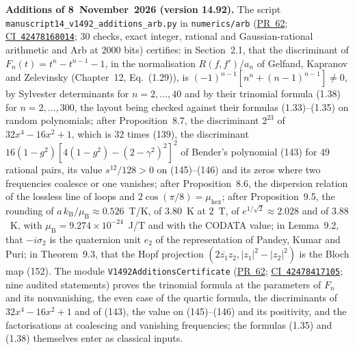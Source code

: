\documentclass[11pt,a4paper]{article}
\newcommand{\R}{https://github.com/ralfanop/Certifications_Eulerian_polar-curve_computations}
\newcommand{\PR}[1]{\href{\R/pull/#1}{PR~#1}}
\newcommand{\CI}[1]{\href{\R/actions/runs/#1}{CI~\texttt{#1}}}
\newcommand{\eq}[1]{(#1)}
\begin{document}
\textbf{Additions of 8~November~2026 (version 14.92).} The script \texttt{manuscript14\_\allowbreak v1492\_\allowbreak additions\_\allowbreak arb.py} in \texttt{numerics/\allowbreak arb} (\PR{62}; \CI{42478168014}; 30 checks, exact integer, rational and Gaussian-rational arithmetic and Arb at 2000 bits) certifies: in Section~2.1, that the discriminant of $F_n(t)=t^n-t^{n-1}-1$, in the normalisation $R(f,f')/a_n$ of Gelfand, Kapranov and Zelevinsky (Chapter~12, Eq.~(1.29)), is $(-1)^{n-1}[n^n+(n-1)^{n-1}]\neq0$, by Sylvester determinants for $n=2,\ldots,40$ and by their trinomial formula (1.38) for $n=2,\ldots,300$, the layout being checked against their formulas (1.33)--(1.35) on random polynomials; after Proposition~8.7, the discriminant $2^{23}$ of $32x^4-16x^2+1$, which is $32$ times \eq{139}, the discriminant $16(1-g^2)[4(1-g^2)-(2-\gamma^2)^2]^2$ of Bender's polynomial \eq{143} for 49 rational pairs, its value $s^{12}/128>0$ on \eq{145}--\eq{146} and its zeros where two frequencies coalesce or one vanishes; after Proposition~8.6, the dispersion relation of the lossless line of loops and $2\cos(\pi/8)=\mu_{\mathrm{hex}}$; after Proposition~9.5, the rounding of $a\,k_{\mathrm B}/\mu_{\mathrm B}\approx0.526$~T/K, of $3.80$~K at $2$~T, of $e^{1/\sqrt2}\approx2.028$ and of $3.88$~K, with $\mu_{\mathrm B}=9.274\times10^{-24}$~J/T and with the CODATA value; in Lemma~9.2, that $-i\sigma_2$ is the quaternion unit $e_2$ of the representation of Pandey, Kumar and Puri; in Theorem~9.3, that the Hopf projection $(2\overline{z_1}z_2,|z_1|^2-|z_2|^2)$ is the Bloch map \eq{152}. The module \texttt{V1492AdditionsCertificate} (\PR{62}; \CI{42478417105}; nine audited statements) proves the trinomial formula at the parameters of $F_n$ and its nonvanishing, the even case of the quartic formula, the discriminants of $32x^4-16x^2+1$ and of \eq{143}, the value on \eq{145}--\eq{146} and its positivity, and the factorisations at coalescing and vanishing frequencies; the formulas (1.35) and (1.38) themselves enter as classical inputs.
\end{document}
